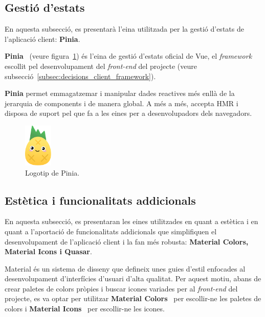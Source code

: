 \documentclass[a4paper,12pt]{ThesisStyle}
\begin{document}
\subsection{Gestió d'estats}
\label{subsec:decisions_client_estats}

En aquesta subsecció, es presentarà l'eina utilitzada per la gestió d'estats de l'aplicació client: \textbf{Pinia}.

\textbf{Pinia}~\cite{Pinia} (veure figura~\ref{img:logo_pinia}) és l'eina de gestió d'estats oficial de Vue, el \textit{framework} escollit pel desenvolupament del \textit{front-end} del projecte (veure subsecció~\ref{subsec:decisions_client_framework}).

\textbf{Pinia} permet emmagatzemar i manipular dades reactives més enllà de la jerarquia de components i de manera global. A més a més, accepta HMR i disposa de suport pel que fa a les eines per a desenvolupadors dels navegadors.

\begin{figure}[H]
  \centering
  \includegraphics[width=0.12\textwidth]{assets/logos/Pinia.png}
  \caption{\label{img:logo_pinia}Logotip de Pinia.}
\end{figure}

\subsection{Estètica i funcionalitats addicionals}
\label{subsec:decisions_client_estetica}

En aquesta subsecció, es presentaran les eines utilitzades en quant a estètica i en quant a l'aportació de funcionalitats addicionals que simplifiquen el desenvolupament de l'aplicació client i la fan més robusta: \textbf{Material Colors, Material Icons i Quasar}.

Material és un sistema de disseny que defineix unes guies d'estil enfocades al desenvolupament d'interfícies d'usuari d'alta qualitat. Per aquest motiu, abans de crear paletes de colors pròpies i buscar icones variades per al \textit{front-end} del projecte, es va optar per utilitzar \textbf{Material Colors}~\cite{MaterialColors} per escollir-ne les paletes de colors i \textbf{Material Icons}~\cite{MaterialIcons} per escollir-ne les icones.
\end{document}
